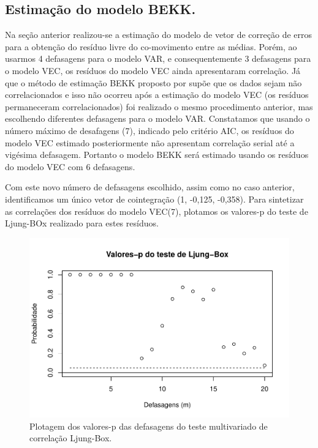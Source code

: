 

\subsection{Estimação do modelo BEKK.}\label{estimacao-do-modelo-bekk.}

Na seção anterior realizou-se a estimação do modelo de vetor de correção
de erros para a obtenção do resíduo livre do co-movimento entre as
médias. Porém, ao usarmos 4 defasagens para o modelo VAR, e
consequentemente 3 defasagens para o modelo VEC, os resíduos do modelo
VEC ainda apresentaram correlação. Já que o método de estimação BEKK
proposto por  supõe que os dados sejam não
correlacionados e isso não ocorreu após a estimação do modelo VEC (os
resíduos permaneceram correlacionados) foi realizado o mesmo
procedimento anterior, mas escolhendo diferentes defasagens para o
modelo VAR. Constatamos que usando o número máximo de desafagens (7),
indicado pelo critério AIC, os resíduos do modelo VEC estimado
posteriormente não apresentam correlação serial até a vigésima
defasagem. Portanto o modelo BEKK será estimado usando os resíduos do
modelo VEC com 6 defasagens.

Com este novo número de defasagens escolhido, assim como no caso
anterior, identificamos um único vetor de cointegração (1, -0,125,
-0,358). Para sintetizar as correlações dos resíduos do modelo VEC(7),
plotamos os valores-p do teste de Ljung-BOx realizado para estes
resíduos.

\begin{figure}[htbp]
\centering
\includegraphics{mq2 test-1.pdf}
\caption{Plotagem dos valores-p das defasagens do teste multivariado de
correlação Ljung-Box.}
\end{figure}

